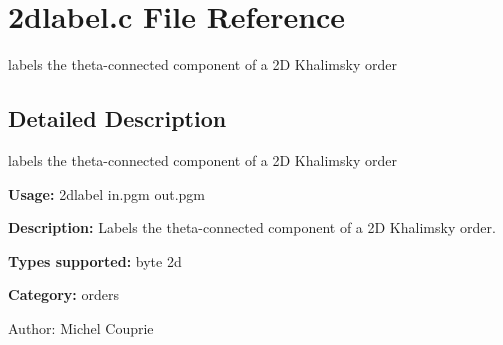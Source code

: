 \section{2dlabel.c File Reference}
\label{2dlabel_8c}
labels the theta-connected component of a 2D Khalimsky order 



\subsection{Detailed Description}
labels the theta-connected component of a 2D Khalimsky order 

{\bf Usage:} 2dlabel in.pgm out.pgm

{\bf Description:} Labels the theta-connected component of a 2D Khalimsky order.

{\bf Types supported:} byte 2d

{\bf Category:} orders

\begin{Desc}
\item[Author:]Michel Couprie \end{Desc}
